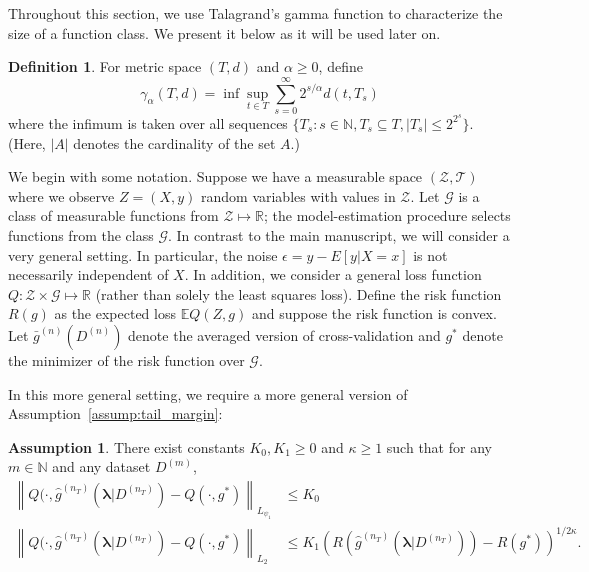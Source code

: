 \documentclass[10pt]{book}
\theoremstyle{definition}
\newtheorem{definition}{Definition}
\newtheorem{assump}{Assumption}
\begin{document}
Throughout this section, we use Talagrand's gamma function \citep{talagrand2006generic} to characterize the size of a function class.
We present it below as it will be used later on.
\begin{definition}
	For metric space $(T,d)$ and $\alpha \ge 0$, define
	$$
	\gamma_\alpha(T,d) = \inf \sup_{t\in T} \sum_{s = 0}^{\infty} 2^{s/\alpha}d(t, T_s)
	$$
	where the infimum is taken over all sequences $\{T_s: s\in \mathbb{N}, T_s \subseteq T, |T_s| \le 2^{2^s} \}$.
	(Here, $|A|$ denotes the cardinality of the set $A$.)
\end{definition}

We begin with some notation.
Suppose we have a measurable space $(\mathcal{Z}, \mathcal{T})$ where we observe $Z = (X,y)$ random variables with values in $\mathcal{Z}$.
Let $\mathcal{G}$ is a class of measurable functions from $\mathcal{Z} \mapsto \mathbb{R}$; the model-estimation procedure selects functions from the class $\mathcal{G}$.
In contrast to the main manuscript, we will consider a very general setting.
In particular, the noise $\epsilon = y - E[y | X=x]$ is not necessarily independent of $X$.
In addition, we consider a general loss function $Q: \mathcal{Z} \times \mathcal{G} \mapsto \mathbb{R}$ (rather than solely the least squares loss).
Define the risk function $R(g)$ as the expected loss $\mathbb{E} Q(Z, g)$ and suppose the risk function is convex.
Let $\bar{g}^{(n)}(D^{(n)})$ denote the averaged version of cross-validation and $g^*$ denote the minimizer of the risk function over $\mathcal{G}$.

In this more general setting, we require a more general version of Assumption~\ref{assump:tail_margin}:
\begin{assump}
	\label{assump:tail_margin_general}
	There exist constants $K_0, K_1 \ge 0$ and $\kappa \ge 1$ such that for any $m \in \mathbb{N}$ and any dataset $D^{(m)}$,
	\begin{align}
	\left \| Q(\cdot, \hat{g}^{(n_T)}(\boldsymbol{\lambda} | D^{(n_T)}) - Q(\cdot, g^*) \right \|_{L_{\psi_1}} & \le K_0
	\label{eq:cv_assump1_app}\\
	\left \| Q(\cdot, \hat{g}^{(n_T)}(\boldsymbol{\lambda} | D^{(n_T)}) - Q(\cdot, g^*)  \right \|_{L_2}
	& \le 
	K_1 \left ( R(\hat{g}^{(n_T)}(\boldsymbol{\lambda}|D^{(n_T)})) - R(g^*) \right )^{1/2\kappa}.
	\label{eq:cv_assump2_app}
	\end{align}
\end{assump}
\end{document}
